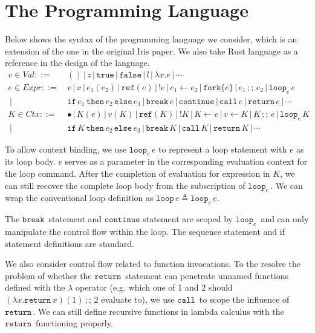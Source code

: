 \documentclass{article}
\numberwithin{algorithm}{section}
\newcommand{\true}{\texttt{true}}
\newcommand{\false}{\texttt{false}}
\newcommand{\cmdref}{\texttt{ref}}
\newcommand{\cmdfork}[1]{\texttt{fork}\{#1\}}
\newcommand{\cmdloop}[1]{\texttt{loop}_{#1}\,}
\newcommand{\cmdbreak}{\texttt{break}\,}
\newcommand{\cmdcontinue}{\texttt{continue}}
\newcommand{\cmdreturn}{\texttt{return}\,}
\newcommand{\cmdif}{\texttt{if}\,}
\newcommand{\cmdthen}{\,\texttt{then}\,}
\newcommand{\cmdelse}{\,\texttt{else}\,}
\newcommand{\cmdseq}{\,;;\,}
\newcommand{\cmdcall}{\texttt{call}\,}
\newcommand{\sep}{\,|\,}
\begin{document}
\section{The Programming Language}

Below shows the syntax of the programming language we consider, which is an extension of the one in the original Iris paper.
We also take Rust language as a reference in the design of the language.
$$
\begin{aligned}
    v \in \textit{Val} ::=\, & () \sep z \sep \true \sep \false \sep l \sep \lambda x.e \sep \cdots \\
    e \in \textit{Expr} ::=\, & v \sep x \sep e_1(e_2) \sep \cmdref(e) \sep !e \sep e_1 \leftarrow e_2 \sep \cmdfork{e} \sep e_1 \cmdseq e_2 \sep \cmdloop{e} e \\
                        \sep\, & \cmdif e_1 \cmdthen e_2 \cmdelse e_3 \sep \cmdbreak e \sep \cmdcontinue \sep \cmdcall e \sep \cmdreturn e \sep \cdots \\
    K \in \textit{Ctx} ::=\, & \bullet \sep K(e) \sep v(K) \sep \cmdref(K) \sep !K \sep K \leftarrow e \sep v \leftarrow K \sep K \cmdseq e \sep \cmdloop{e} K \\
                        \sep\, & \cmdif K \cmdthen e_2 \cmdelse e_3 \sep \cmdbreak K \sep \cmdcall K \sep \cmdreturn K \sep \cdots
\end{aligned}
$$

To allow context binding, we use $\cmdloop{e} e$ to represent a loop statement with $e$ as its loop body.
$e$ serves as a parameter in the corresponding evaluation context for the loop command.
After the completion of evaluation for expression in $K$, we can still recover the complete loop body from the subscription of $\cmdloop{e}\!$.
We can wrap the conventional loop definition as $\texttt{loop}\, e \triangleq \cmdloop{e} e$.

The $\cmdbreak\!$ statement and $\cmdcontinue$ statement are scoped by $\cmdloop{e}\!$ and can only manipulate the control flow within the loop.
The sequence statement and if statement definitions are standard.

We also consider control flow related to function invocations.
To the resolve the problem of whether the $\cmdreturn\!$ statement can penetrate unnamed functions defined with the $\lambda$ operator (e.g. which one of 1 and 2 should $(\lambda x. \cmdreturn x)(1) \cmdseq 2$ evaluate to), we use $\cmdcall\!$ to scope the influence of $\cmdreturn\!$.
We can still define recursive functions in lambda calculus with the $\cmdreturn\!$ functioning properly.
\end{document}
